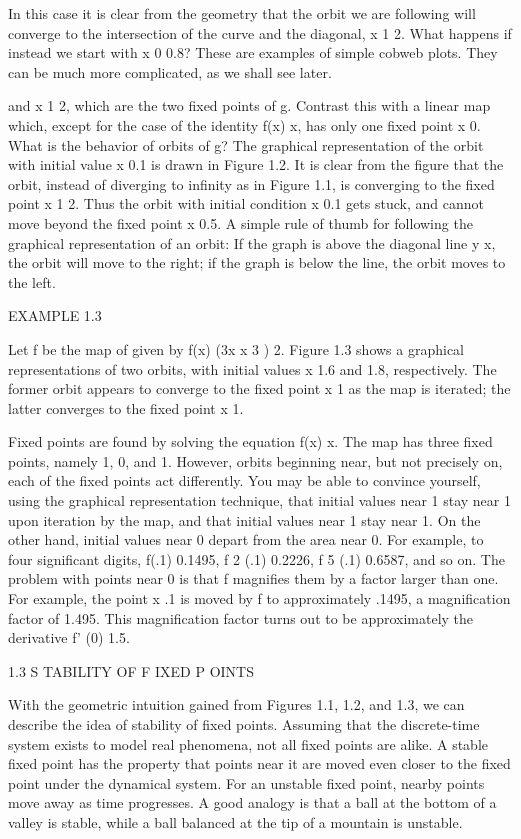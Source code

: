 \documentclass[12pt]{article}
\begin{document}
In this case it is clear from the geometry that the orbit we are following will converge to the 
intersection of the curve and the diagonal, x  1  2. What happens if instead we start with x 0  0.8? These 
are examples of simple cobweb plots. They can be much more complicated, as we shall see later.

and x  1  2, which are the two fixed points of g. Contrast this with a linear map which, except for the 
case of the identity f(x)  x, has only one fixed point x  0. What is the behavior of orbits of g? The 
graphical representation of the orbit with initial value x  0.1 is drawn in Figure 1.2. It is clear from 
the figure that the orbit, instead of diverging to infinity as in Figure 1.1, is converging to the fixed 
point x  1  2. Thus the orbit with initial condition x  0.1 gets stuck, and cannot move beyond the fixed 
point x  0.5. A simple rule of thumb for following the graphical representation of an orbit: If the graph 
is above the diagonal line y  x, the orbit will move to the right; if the graph is below the line, the 
orbit moves to the left.

EXAMPLE 1.3

Let f be the map of given by f(x)  (3x  x 3 )  2. Figure 1.3 shows a graphical representations of two 
orbits, with initial values x  1.6 and 1.8, respectively. The former orbit appears to converge to the fixed 
point x  1 as the map is iterated; the latter converges to the fixed point x  1.

Fixed points are found by solving the equation f(x)  x. The map has three fixed points, namely 1, 0, and 1. 
However, orbits beginning near, but not precisely on, each of the fixed points act differently. You may be 
able to convince yourself, using the graphical representation technique, that initial values near 1 stay 
near 1 upon iteration by the map, and that initial values near 1 stay near 1. On the other hand, initial 
values near 0 depart from the area near 0. For example, to four significant digits, f(.1)  0.1495, f 2 (.1)  
0.2226, f 5 (.1)  0.6587, and so on. The problem with points near 0 is that f magnifies them by a factor 
larger than one. For example, the point x  .1 is moved by f to approximately .1495, a magnification factor 
of 1.495. This magnification factor turns out to be approximately the derivative f' (0)  1.5.

1.3 S TABILITY OF F IXED P OINTS

With the geometric intuition gained from Figures 1.1, 1.2, and 1.3, we can describe the idea of stability 
of fixed points. Assuming that the discrete-time system exists to model real phenomena, not all fixed 
points are alike. A stable fixed point has the property that points near it are moved even closer to the 
fixed point under the dynamical system. For an unstable fixed point, nearby points move away as time 
progresses. A good analogy is that a ball at the bottom of a valley is stable, while a ball balanced at the 
tip of a mountain is unstable.
\end{document}
